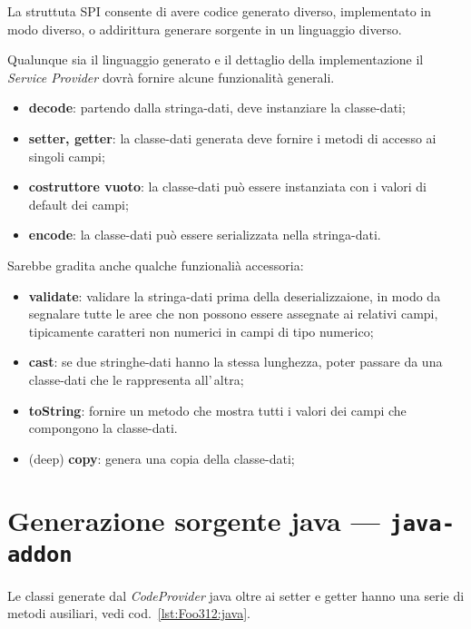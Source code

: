 \documentclass[a4paper,10pt]{report}
\begin{document}
La struttuta SPI consente di avere codice generato diverso, implementato in modo
diverso, o addirittura generare sorgente in un linguaggio diverso.

Qualunque sia il linguaggio generato e il dettaglio della implementazione il
\textsl{Service Provider} dovrà fornire alcune funzionalità generali.

\begin{itemize}
\item \textbf{decode}: partendo dalla stringa-dati, deve instanziare la 
    classe-dati;
\item \textbf{setter, getter}: la classe-dati generata deve fornire i metodi di 
    accesso ai singoli campi;
\item \textbf{costruttore vuoto}: la classe-dati può essere instanziata con i 
    valori di default dei campi;
\item \textbf{encode}: la classe-dati può essere serializzata nella 
    stringa-dati.
\end{itemize}
Sarebbe gradita anche qualche funzionalià accessoria:
\begin{itemize}
\item \textbf{validate}: validare la stringa-dati prima della 
    deserializzaione, in modo da segnalare tutte le aree che non possono essere
    assegnate ai relativi campi, tipicamente caratteri non numerici in campi di
    tipo numerico;
\item \textbf{cast}: se due stringhe-dati hanno la stessa lunghezza, poter 
    passare da una classe-dati che le rappresenta all'\,altra;
\item \textbf{toString}: fornire un metodo che mostra tutti i valori dei campi 
    che compongono la classe-dati.
\item (deep) \textbf{copy}: genera una copia della classe-dati;
\end{itemize}



\section{Generazione sorgente java --- \texttt{java-addon}}
Le classi generate dal \textsl{CodeProvider} java oltre ai setter e getter
hanno una serie di metodi ausiliari, vedi cod.~\ref{lst:Foo312:java}.
\end{document}
